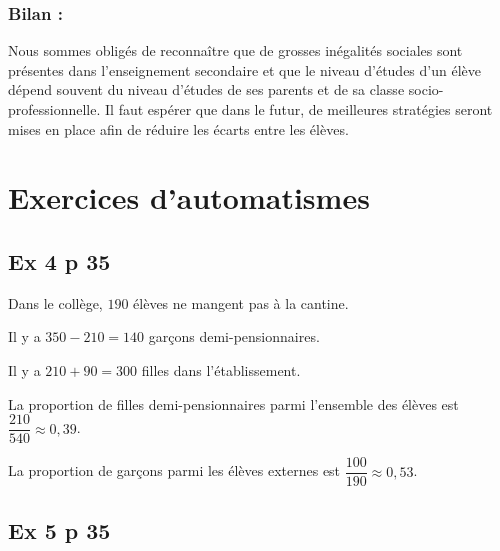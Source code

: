 \documentclass[12pt,a4paper]{book}
\begin{document}
\subsubsection*{Bilan :}

Nous sommes obligés de reconnaître que de grosses inégalités sociales sont présentes dans l'enseignement secondaire et que le niveau d'études d'un élève dépend souvent du niveau d'études de ses parents et de sa classe socio-professionnelle. Il faut espérer que dans le futur, de meilleures stratégies seront mises en place afin de réduire les écarts entre les élèves.

\section*{Exercices d'automatismes}

\subsection*{Ex 4 p 35}


\begin{enumMet}
	\item Dans le collège, $190$ élèves ne mangent pas à la cantine.         
	\item Il y a $350-210 = 140$ garçons demi-pensionnaires.         
	\item Il y a $210+90=300$ filles dans l'établissement.
	\item La proportion de filles demi-pensionnaires parmi l'ensemble des élèves est $\dfrac{210}{540}         \approx 0,39$.
	\item La proportion de garçons parmi les élèves externes est $\dfrac{100}{190} \approx 0,53$.
\end{enumMet}

\subsection*{Ex 5 p 35}
\end{document}
